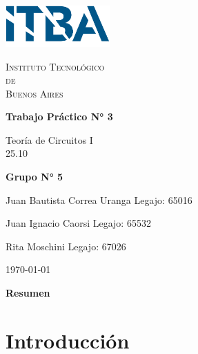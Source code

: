 \documentclass{article}
\newcommand{\Facultad}{Instituto Tecnológico \\de\\ Buenos Aires} %
\newcommand{\TPn}{Trabajo Práctico N° 3}
\begin{document}
\begin{titlepage} %

        \begin{flushleft}
            \centering
            \includegraphics[width=0.3\textwidth]{Logo_ITBA.png}
        \end{flushleft}

        \centering
            
        {\scshape\LARGE \Facultad \par} %
        \vspace{1cm}                    %


        {\huge\bfseries \TPn \par}
        \vspace{1.5cm}
        {\Large Teoría de Circuitos I\\ 25.10 \par}
        \vfill                      %
        {\Large \bfseries Grupo N° 5 \par}
        \vspace{1cm}
        {\large Juan Bautista Correa Uranga \hfill Legajo: 65016 \par} %
        {\large Juan Ignacio Caorsi \hfill Legajo: 65532  \par}
        {\large Rita Moschini \hfill Legajo: 67026 \par} 
        \vfill
        {\large \today\par}
        \vfil

    \end{titlepage}

{\centering \LARGE \bfseries Resumen \par}

\newpage

\tableofcontents %

\newpage

\section{Introducción}
\end{document}
